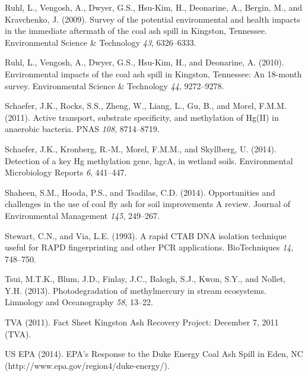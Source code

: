 \documentclass[ms, hidelinks]{uncgdissertationexp}
\theoremstyle{plain}
\theoremstyle{definition}
\theoremstyle{remark}
\begin{document}
\leavevmode\hypertarget{ref-ruhlSurveyPotentialEnvironmental2009}{}%
Ruhl, L., Vengosh, A., Dwyer, G.S., Hsu-Kim, H., Deonarine, A., Bergin, M., and Kravchenko, J. (2009). Survey of the potential environmental and health impacts in the immediate aftermath of the coal ash spill in Kingston, Tennessee. Environmental Science \& Technology \emph{43}, 6326--6333.

\leavevmode\hypertarget{ref-ruhlEnvironmentalImpactsCoal2010}{}%
Ruhl, L., Vengosh, A., Dwyer, G.S., Hsu-Kim, H., and Deonarine, A. (2010). Environmental impacts of the coal ash spill in Kingston, Tennessee: An 18-month survey. Environmental Science \& Technology \emph{44}, 9272--9278.

\leavevmode\hypertarget{ref-schaeferActiveTransportSubstrate2011}{}%
Schaefer, J.K., Rocks, S.S., Zheng, W., Liang, L., Gu, B., and Morel, F.M.M. (2011). Active transport, substrate specificity, and methylation of Hg(II) in anaerobic bacteria. PNAS \emph{108}, 8714--8719.

\leavevmode\hypertarget{ref-schaeferDetectionKeyHg2014}{}%
Schaefer, J.K., Kronberg, R.-M., Morel, F.M.M., and Skyllberg, U. (2014). Detection of a key Hg methylation gene, hgcA, in wetland soils. Environmental Microbiology Reports \emph{6}, 441--447.

\leavevmode\hypertarget{ref-shaheenOpportunitiesChallengesUse2014}{}%
Shaheen, S.M., Hooda, P.S., and Tsadilas, C.D. (2014). Opportunities and challenges in the use of coal fly ash for soil improvements A review. Journal of Environmental Management \emph{145}, 249--267.

\leavevmode\hypertarget{ref-stewartRapidCTABDNA1993}{}%
Stewart, C.N., and Via, L.E. (1993). A rapid CTAB DNA isolation technique useful for RAPD fingerprinting and other PCR applications. BioTechniques \emph{14}, 748--750.

\leavevmode\hypertarget{ref-tsuiPhotodegradationMethylmercuryStream2013}{}%
Tsui, M.T.K., Blum, J.D., Finlay, J.C., Balogh, S.J., Kwon, S.Y., and Nollet, Y.H. (2013). Photodegradation of methylmercury in stream ecosystems. Limnology and Oceanography \emph{58}, 13--22.

\leavevmode\hypertarget{ref-tvaFactSheetKingston2011}{}%
TVA (2011). Fact Sheet Kingston Ash Recovery Project: December 7, 2011 (TVA).

\leavevmode\hypertarget{ref-usepaEPAResponseDuke2014}{}%
US EPA (2014). EPA's Response to the Duke Energy Coal Ash Spill in Eden, NC (http://www.epa.gov/region4/duke-energy/).
\end{document}
